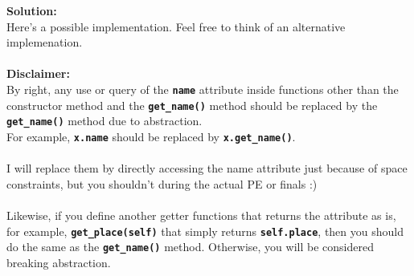 \textbf{Solution:} \\
Here's a possible implementation. Feel free to think of an alternative implemenation. \\ \\
\textbf{Disclaimer:} \\
By right, any use or query of the \texttt{\bfseries name} attribute inside functions other than the constructor 
method and the \texttt{\bfseries get\_name()} method should be replaced by the \texttt{\bfseries get\_name()} method 
due to abstraction. \\
For example, \texttt{\bfseries x.name} should be replaced by \texttt{\bfseries x.get\_name()}. \\ \\
I will replace them by directly accessing the name attribute just because of space constraints, 
but you shouldn't during the actual PE or finals :) \\ \\
Likewise, if you define another getter functions that returns the attribute as is, for example, 
\texttt{\bfseries get\_place(self)} that simply returns \texttt{\bfseries self.place}, then you should do the same as 
the \texttt{\bfseries get\_name()} method. Otherwise, you will be considered breaking abstraction.
